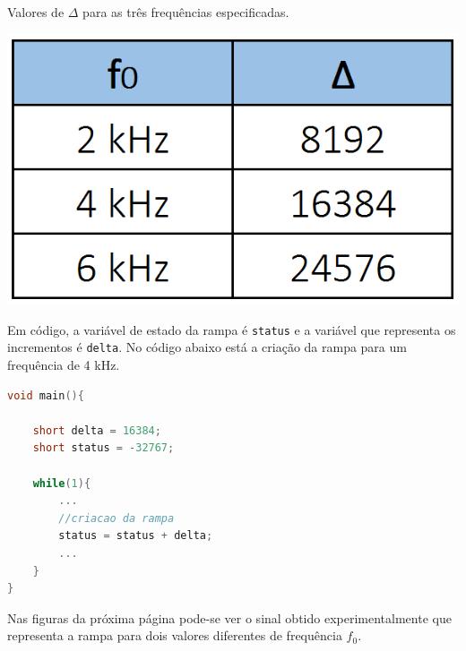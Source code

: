 \documentclass[11pt]{article}
\numberwithin{equation}{section}
\begin{document}
\begin{table}[H]
	\centering
	\caption{Valores de $\Delta$ para as três frequências especificadas.}
	\vspace{-1.5mm}
	\includegraphics[keepaspectratio=true, scale=0.45]{tabelas/tabela2}
\end{table}

Em código, a variável de estado da rampa é \texttt{status} e a variável que representa os incrementos é \texttt{delta}. No código abaixo está a criação da rampa para um frequência de 4 kHz.

\begin{lstlisting}[language=C]
void main(){

	short delta = 16384;
	short status = -32767;

	while(1){
		...	
		//criacao da rampa	
		status = status + delta;
		...
	}
}
\end{lstlisting}

Nas figuras da próxima página pode-se ver o sinal obtido experimentalmente que representa a rampa para dois valores diferentes de frequência $f_{0}$.
\end{document}
